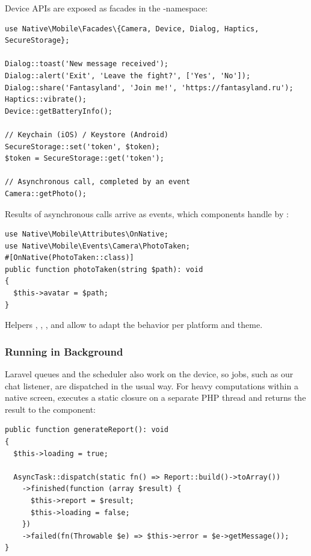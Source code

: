 Device APIs are exposed as facades in the 
-namespace:

\begin{lstlisting}
use Native\Mobile\Facades\{Camera, Device, Dialog, Haptics, SecureStorage};

Dialog::toast('New message received');
Dialog::alert('Exit', 'Leave the fight?', ['Yes', 'No']);
Dialog::share('Fantasyland', 'Join me!', 'https://fantasyland.ru');
Haptics::vibrate();
Device::getBatteryInfo();

// Keychain (iOS) / Keystore (Android)
SecureStorage::set('token', $token);
$token = SecureStorage::get('token');

// Asynchronous call, completed by an event
Camera::getPhoto();
\end{lstlisting}

\noindent Results of asynchronous calls arrive as events, which components handle by \q{\#[OnNative]}:

\begin{lstlisting}
use Native\Mobile\Attributes\OnNative;
use Native\Mobile\Events\Camera\PhotoTaken;
#[OnNative(PhotoTaken::class)]
public function photoTaken(string $path): void
{
  $this->avatar = $path;
}
\end{lstlisting}

\noindent Helpers , , , and  allow to adapt
the behavior per platform and theme.


\subsubsection{Running in Background}

Laravel queues and the scheduler also work on the device, so jobs, such as our chat listener,
are dispatched in the usual way. For heavy computations within a native screen, 
executes a static closure on a separate PHP thread and returns the result to the component:

\begin{lstlisting}
public function generateReport(): void
{
  $this->loading = true;

  AsyncTask::dispatch(static fn() => Report::build()->toArray())
    ->finished(function (array $result) {
      $this->report = $result;
      $this->loading = false;
    })
    ->failed(fn(Throwable $e) => $this->error = $e->getMessage());
}
\end{lstlisting}


